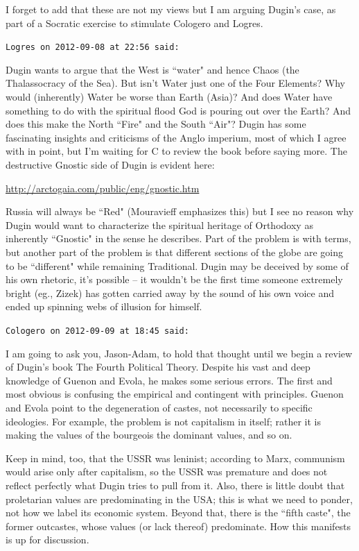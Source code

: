 \begin{footnotesize}
\begin{sffamily}
I forget to add that these are not my views but I am arguing Dugin's case, as part of a Socratic exercise to stimulate Cologero and Logres.


\hfill

\texttt{Logres on 2012-09-08 at 22:56 said: }

Dugin wants to argue that the West is ``water" and hence Chaos (the Thalassocracy of the Sea). But isn't Water just one of the Four Elements? Why would (inherently) Water be worse than Earth (Asia)? And does Water have something to do with the spiritual flood God is pouring out over the Earth? And does this make the North ``Fire" and the South ``Air"? Dugin has some fascinating insights and criticisms of the Anglo imperium, most of which I agree with in point, but I'm waiting for C to review the book before saying more. The destructive Gnostic side of Dugin is evident here:

\url{http://arctogaia.com/public/eng/gnostic.htm}

Russia will always be ``Red" (Mouravieff emphasizes this) but I see no reason why Dugin would want to characterize the spiritual heritage of Orthodoxy as inherently ``Gnostic" in the sense he describes. Part of the problem is with terms, but another part of the problem is that different sections of the globe are going to be ``different" while remaining Traditional. Dugin may be deceived by some of his own rhetoric, it's possible – it wouldn't be the first time someone extremely bright (eg., Zizek) has gotten carried away by the sound of his own voice and ended up spinning webs of illusion for himself.


\hfill

\texttt{Cologero on 2012-09-09 at 18:45 said: }

I am going to ask you, Jason-Adam, to hold that thought until we begin a review of Dugin's book The Fourth Political Theory. Despite his vast and deep knowledge of Guenon and Evola, he makes some serious errors. The first and most obvious is confusing the empirical and contingent with principles. Guenon and Evola point to the degeneration of castes, not necessarily to specific ideologies. For example, the problem is not capitalism in itself; rather it is making the values of the bourgeois the dominant values, and so on.

Keep in mind, too, that the USSR was leninist; according to Marx, communism would arise only after capitalism, so the USSR was premature and does not reflect perfectly what Dugin tries to pull from it. Also, there is little doubt that proletarian values are predominating in the USA; this is what we need to ponder, not how we label its economic system. Beyond that, there is the ``fifth caste", the former outcastes, whose values (or lack thereof) predominate. How this manifests is up for discussion.


\end{sffamily}
\end{footnotesize}
